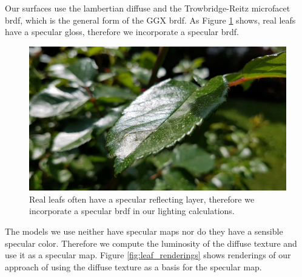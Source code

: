 Our surfaces use the lambertian diffuse \cite{lambert} and the Trowbridge-Reitz \cite{trowbridge_reitz} microfacet \ac{brdf}, which is the general form of the GGX \ac{brdf}.
As Figure \ref{fig:leaf_gloss} shows, real leafs have a specular gloss, therefore we incorporate a specular \ac{brdf}.
\begin{figure}[ht]
    \centering
    \includegraphics[width=0.5\linewidth]{img/leaf_gloss.jpg}
    \caption{Real leafs often have a specular reflecting layer, therefore we incorporate a specular \ac{brdf} in our lighting calculations.}
    \label{fig:leaf_gloss}
\end{figure} 
The models we use neither have specular maps nor do they have a sensible specular color.
Therefore we compute the luminosity of the diffuse texture and use it as a specular map.
Figure \ref{fig:leaf_renderings} shows renderings of our approach of using the diffuse texture as a basis for the specular map.
